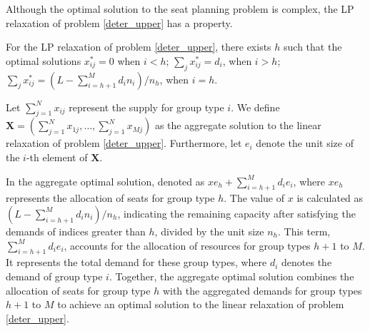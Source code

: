 
Although the optimal solution to the seat planning problem is complex, the LP relaxation of problem \eqref{deter_upper} has a property.

\begin{prop}\label{sol_relax_deter}
For the LP relaxation of problem \eqref{deter_upper}, there exists $h$ such that the optimal solutions $x_{ij}^{*} = 0$ when $i < h$; $\sum_{j} x_{ij}^{*} = d_{i}$, when $i > h$; $\sum_{j} x_{ij}^{*} = (L - \sum_{i = h+1}^{M} {d_i n_i})/ n_h$, when $i = h$.
\end{prop}

Let $\sum_{j=1}^{N} x_{ij}$ represent the supply for group type $i$. We define $\mathbf{X} = (\sum_{j=1}^{N} x_{1j},\ldots, \sum_{j=1}^{N} x_{Mj})$ as the aggregate solution to the linear relaxation of problem \eqref{deter_upper}. Furthermore, let $e_{i}$ denote the unit size of the $i$-th element of $\mathbf{X}$.

In the aggregate optimal solution, denoted as $x e_{h} + \sum_{i=h+1} ^{M} d_{i} e_{i}$, where $x e_{h}$ represents the allocation of seats for group type $h$. The value of $x$ is calculated as $(L- \sum_{i = h+1}^{M} {d_i n_i})/ n_h$, indicating the remaining capacity after satisfying the demands of indices greater than $h$, divided by the unit size $n_h$. This term, $\sum_{i=h+1} ^{M} d_{i} e_{i}$, accounts for the allocation of resources for group types $h+1$ to $M$. It represents the total demand for these group types, where $d_i$ denotes the demand of group type $i$. Together, the aggregate optimal solution combines the allocation of seats for group type $h$ with the aggregated demands for group types $h+1$ to $M$ to achieve an optimal solution to the linear relaxation of problem \eqref{deter_upper}.




